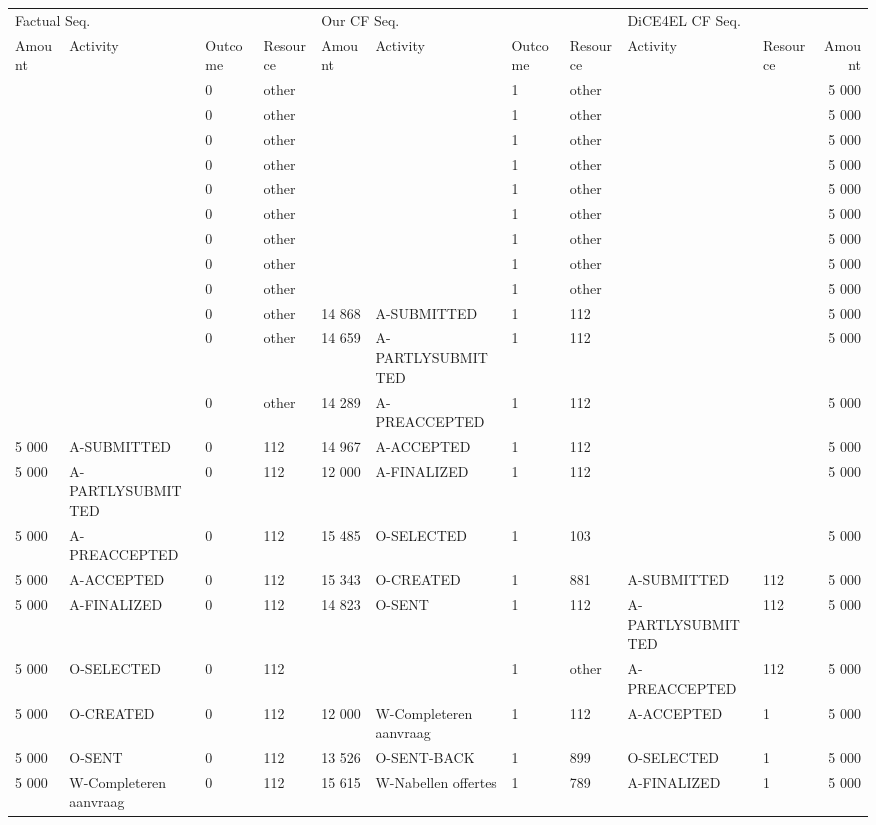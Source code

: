 \begin{tabular}{llllllllllr}
\toprule
\multicolumn{4}{l}{Factual Seq.} & \multicolumn{4}{l}{Our CF Seq.} & \multicolumn{3}{l}{DiCE4EL CF Seq.} \\
Amount & Activity & Outcome & Resource & Amount & Activity & Outcome & Resource & Activity & Resource & Amount \\
\midrule
 &  & 0 & other &  &  & 1 & other &  &  & 5 000 \\
 &  & 0 & other &  &  & 1 & other &  &  & 5 000 \\
 &  & 0 & other &  &  & 1 & other &  &  & 5 000 \\
 &  & 0 & other &  &  & 1 & other &  &  & 5 000 \\
 &  & 0 & other &  &  & 1 & other &  &  & 5 000 \\
 &  & 0 & other &  &  & 1 & other &  &  & 5 000 \\
 &  & 0 & other &  &  & 1 & other &  &  & 5 000 \\
 &  & 0 & other &  &  & 1 & other &  &  & 5 000 \\
 &  & 0 & other &  &  & 1 & other &  &  & 5 000 \\
 &  & 0 & other & 14 868 & A-SUBMITTED & 1 & 112 &  &  & 5 000 \\
 &  & 0 & other & 14 659 & A-PARTLYSUBMITTED & 1 & 112 &  &  & 5 000 \\
 &  & 0 & other & 14 289 & A-PREACCEPTED & 1 & 112 &  &  & 5 000 \\
5 000 & A-SUBMITTED & 0 & 112 & 14 967 & A-ACCEPTED & 1 & 112 &  &  & 5 000 \\
5 000 & A-PARTLYSUBMITTED & 0 & 112 & 12 000 & A-FINALIZED & 1 & 112 &  &  & 5 000 \\
5 000 & A-PREACCEPTED & 0 & 112 & 15 485 & O-SELECTED & 1 & 103 &  &  & 5 000 \\
5 000 & A-ACCEPTED & 0 & 112 & 15 343 & O-CREATED & 1 & 881 & A-SUBMITTED & 112 & 5 000 \\
5 000 & A-FINALIZED & 0 & 112 & 14 823 & O-SENT & 1 & 112 & A-PARTLYSUBMITTED & 112 & 5 000 \\
5 000 & O-SELECTED & 0 & 112 &  &  & 1 & other & A-PREACCEPTED & 112 & 5 000 \\
5 000 & O-CREATED & 0 & 112 & 12 000 & W-Completeren aanvraag & 1 & 112 & A-ACCEPTED & 1 & 5 000 \\
5 000 & O-SENT & 0 & 112 & 13 526 & O-SENT-BACK & 1 & 899 & O-SELECTED & 1 & 5 000 \\
5 000 & W-Completeren aanvraag & 0 & 112 & 15 615 & W-Nabellen offertes & 1 & 789 & A-FINALIZED & 1 & 5 000 \\

\end{tabular}
